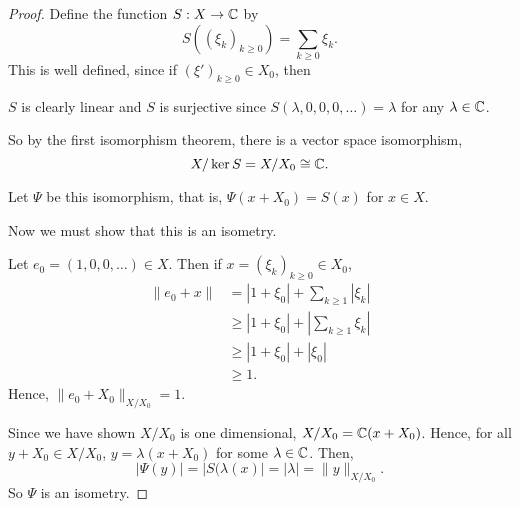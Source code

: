 \documentclass{unswmaths}
\begin{document}
\begin{proof}
    Define the function $S:X\rightarrow \mathbb{C}$ by
    \begin{equation*}
        S((\xi_k)_{k\geq 0}) = \sum_{k\geq 0} \xi_k.
    \end{equation*}
    This is well defined, since if $(\xi')_{k\geq 0} \in X_0$, then 
%    


    $S$ is clearly linear and $S$ is surjective since $S(\lambda,0,0,0,\ldots) = \lambda$ for any $\lambda \in \mathbb{C}$.
    
    So by the first isomorphism theorem, there is a vector space isomorphism,
    \begin{equation*}
        X/\ker S = X/X_0 \cong \mathbb{C}.
    \end{equation*}
    
    Let $\Psi$ be this isomorphism, that is,
    $\Psi(x+X_0) = S(x)$ for $x \in X$.
    
    Now we must show that this is an isometry.
    
    Let $e_0 = (1,0,0,\ldots) \in X$. Then if $x = (\xi_k)_{k\geq 0} \in X_0$, 
    \begin{align*}
        \|e_0+x\| &= |1+\xi_0| + \sum_{k\geq 1} |\xi_k|\\
        &\geq |1+\xi_0|+|\sum_{k\geq 1} \xi_k|\\
        &\geq |1+\xi_0|+|\xi_0|\\
        &\geq 1.
    \end{align*}
    Hence, $\|e_0+X_0\|_{X/X_0} = 1$. 
    
%    
    
    
    Since we have shown $X/X_0$ is one dimensional, $X/X_0 = \mathbb{C}(x+X_0)$. Hence, for 
    all $y + X_0 \in X/X_0$, $y = \lambda(x+X_0)$ for some $\lambda \in \mathbb{C}$. Then,
    \begin{equation*}
        |\Psi(y)| = |S(\lambda(x)| = |\lambda| = \|y\|_{X/X_0}.
    \end{equation*}
    So $\Psi$ is an isometry.
\end{proof}
\end{document}
